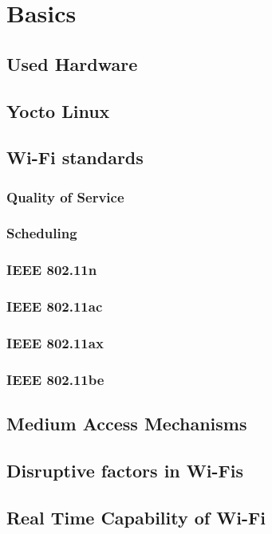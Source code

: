 \chapter{Basics}
\section{Used Hardware}
\section{Yocto Linux}
\section{Wi-Fi standards}
\subsection{Quality of Service}
\subsection{Scheduling}
\subsection{IEEE 802.11n}
\subsection{IEEE 802.11ac}
\subsection{IEEE 802.11ax}
\subsection{IEEE 802.11be}
\section{Medium Access Mechanisms}
\section{Disruptive factors in Wi-Fis}
\section{Real Time Capability of Wi-Fi}